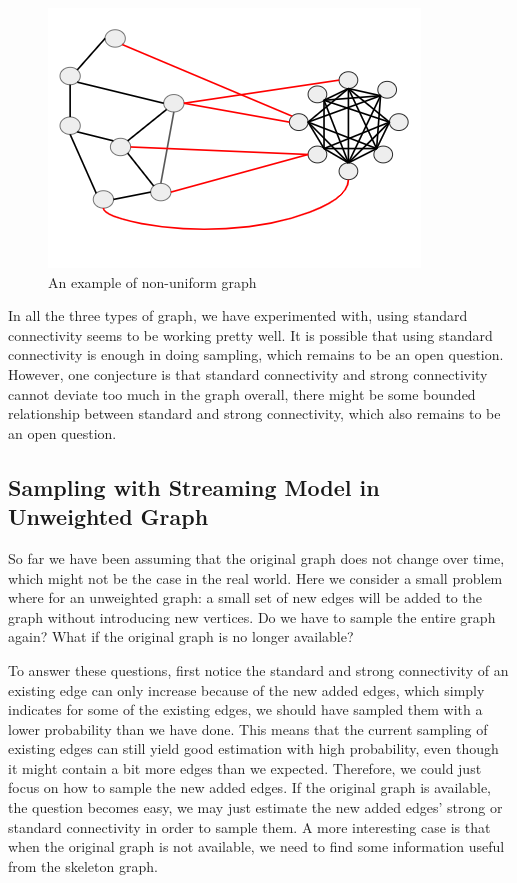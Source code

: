 \documentclass{article}
\begin{document}
\begin{figure}[h!]
\centering
\includegraphics[scale=0.4]{images/non_unifrom_graph.png}
\caption{An example of non-uniform graph}
\label{fig:non_unifrom_graph}
\end{figure}

In all the three types of graph, we have experimented with, using standard connectivity seems to be working pretty well. It is possible that using standard connectivity is enough in doing sampling, which remains to be an open question. However, one conjecture is that standard connectivity and strong connectivity cannot deviate too much in the graph overall, there might be some bounded relationship between standard and strong connectivity, which also remains to be an open question.

\subsection{Sampling with Streaming Model in Unweighted Graph}
So far we have been assuming that the original graph does not change over time, which might not be the case in the real world. Here we consider a small problem where for an unweighted graph: a small set of new edges will be added to the graph without introducing new vertices. Do we have to sample the entire graph again? What if the original graph is no longer available?

\bigskip

To answer these questions, first notice the standard and strong connectivity of an existing edge can only increase because of the new added edges, which simply indicates for some of the existing edges, we should have sampled them with a lower probability than we have done. This means that the current sampling of existing edges can still yield good estimation with high probability, even though it might contain a bit more edges than we expected. Therefore, we could just focus on how to sample the new added edges. If the original graph is available, the question becomes easy, we may just estimate the new added edges' strong or standard connectivity in order to sample them. A more interesting case is that when the original graph is not available, we need to find some information useful from the skeleton graph.
\end{document}
